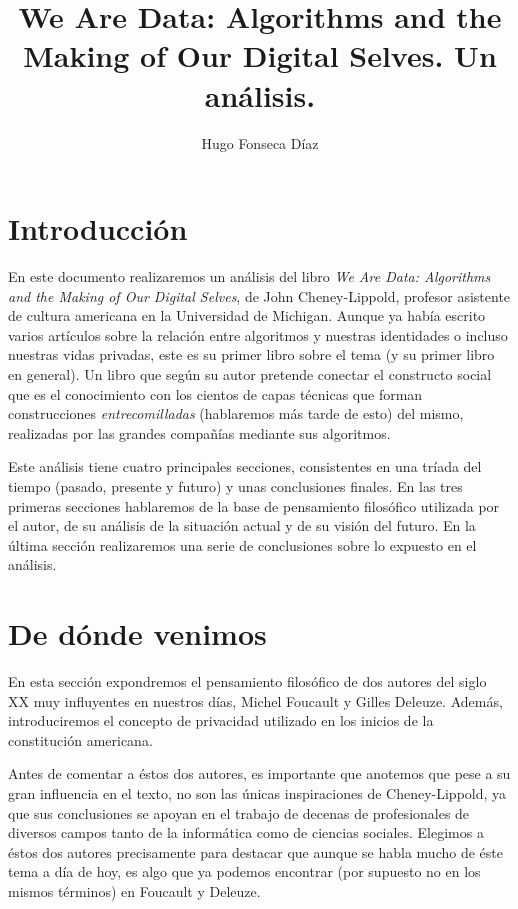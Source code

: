 \documentclass[11pt]{article}
\begin{document}
\title{We Are Data: Algorithms and the Making of Our Digital Selves. Un análisis.}
\author{Hugo Fonseca Díaz\\ }
\maketitle
\tableofcontents
\section{Introducción}
En este documento realizaremos un análisis del libro \textit{We Are Data: Algorithms and the Making of Our Digital Selves}, de John Cheney-Lippold, profesor asistente de cultura americana en la Universidad de Michigan. Aunque ya había escrito varios artículos sobre la relación entre algoritmos y nuestras identidades o incluso nuestras vidas privadas, este es su primer libro sobre el tema (y su primer libro en general). Un libro que según su autor pretende conectar el constructo social que es el conocimiento con los cientos de capas técnicas que forman construcciones \textit{entrecomilladas} (hablaremos más tarde de esto) del mismo, realizadas por las grandes compañías mediante sus algoritmos.

Este análisis tiene cuatro principales secciones, consistentes en una tríada del tiempo (pasado, presente y futuro) y unas conclusiones finales. En las tres primeras secciones hablaremos de la base de pensamiento filosófico utilizada por el autor, de su análisis de la situación actual y de su visión del futuro. En la última sección realizaremos una serie de conclusiones sobre lo expuesto en el análisis.
\section{De dónde venimos}
En esta sección expondremos el pensamiento filosófico de dos autores del siglo XX muy influyentes en nuestros días, Michel Foucault y Gilles Deleuze. Además, introduciremos el concepto de privacidad utilizado en los inicios de la constitución americana.

Antes de comentar a éstos dos autores, es importante que anotemos que pese a su gran influencia en el texto, no son las únicas inspiraciones de Cheney-Lippold, ya que sus conclusiones se apoyan en el trabajo de decenas de profesionales de diversos campos tanto de la informática como de ciencias sociales. Elegimos a éstos dos autores precisamente para destacar que aunque se habla mucho de éste tema a día de hoy, es algo que ya podemos encontrar (por supuesto no en los mismos términos) en Foucault y Deleuze. 
\end{document}
